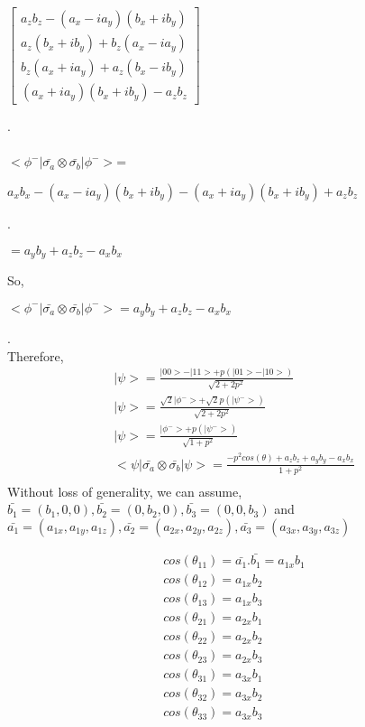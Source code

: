 \documentclass{article}
\begin{document}
  \centerline{ $\begin{bmatrix}
  a_zb_z - (a_x-ia_y)(b_x+ib_y)\\
  a_z(b_x+ib_y) +b_z(a_x-ia_y)\\
  b_z(a_x+ia_y)+a_z(b_x-ib_y)\\
  (a_x+ia_y)(b_x+ib_y)-a_zb_z
  \end{bmatrix}$}
  .\\\\
  $<\phi^-|\bar{\sigma_a}\otimes\bar{\sigma_b}|\phi^->$=\\
  	\centerline{$a_xb_x-(a_x-ia_y)(b_x+ib_y)-(a_x+ia_y)(b_x+ib_y)+a_zb_z$}
  	.\\
  	\centerline{$=a_yb_y+a_zb_z-a_xb_x$}
  	
  So,\\
    \centerline{$<\phi^-|\bar{\sigma_a}\otimes\bar{\sigma_b}|\phi^->=a_yb_y+a_zb_z-a_xb_x$}
    .\\
    
   Therefore,\\
   \begin{align*}
    |\psi>=\frac{|00>-|11>+p(|01>-|10>)}{\sqrt{2+2p^2}}\\
    |\psi>=\frac{\sqrt{2}|\phi^->+\sqrt{2}p(|\psi^->)}{\sqrt{2+2p^2}}\\
    |\psi>=\frac{|\phi^->+p(|\psi^->)}{\sqrt{1+p^2}}\\
    <\psi|\bar{\sigma_a}\otimes\bar{\sigma_b}|\psi>=\frac{-p^2cos(\theta)+a_zb_z+a_yb_y-a_xb_x}{1+p^2}\\
   \end{align*}
    Without loss of generality, we can assume, $\bar{b_1}=(b_1,0,0),       	\bar{b_2}=(0,b_2,0), \bar{b_3}=(0,0,b_3)$ and $\bar{a_1}=(a_{1x},a_{1y},a_{1z}),\bar{a_2}=(a_{2x},a_{2y},a_{2z}),\bar{a_3}=(a_{3x},a_{3y},a_{3z})$
    
   \begin{align*}
   cos(\theta_{11})=\bar{a_1}.\bar{b_1}=a_{1x}b_1\\
   cos(\theta_{12})=a_{1x}b_2\\
   cos(\theta_{13})=a_{1x}b_3\\
   cos(\theta_{21})=a_{2x}b_1\\
   cos(\theta_{22})=a_{2x}b_2\\
   cos(\theta_{23})=a_{2x}b_3\\
   cos(\theta_{31})=a_{3x}b_1\\
   cos(\theta_{32})=a_{3x}b_2\\
   cos(\theta_{33})=a_{3x}b_3\\
   \end{align*}
   
\end{document}
